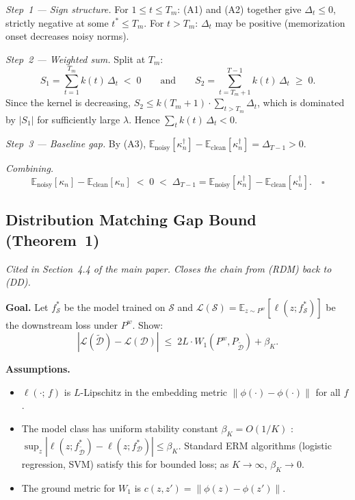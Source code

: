 \textit{Step~1 --- Sign structure.}
For $1 \leq t \leq T_m$: (A1) and (A2) together give $\Delta_t \leq 0$, strictly negative at some $t^* \leq T_m$.
For $t > T_m$: $\Delta_t$ may be positive (memorization onset decreases noisy norms).

\textit{Step~2 --- Weighted sum.}
Split at $T_m$:
\begin{equation}
    S_1 = \sum_{t=1}^{T_m} k(t)\,\Delta_t \;<\; 0
    \qquad \text{and} \qquad
    S_2 = \sum_{t=T_m+1}^{T-1} k(t)\,\Delta_t \;\geq\; 0.
\end{equation}
Since the kernel is decreasing, $S_2 \leq k(T_m+1) \cdot \sum_{t > T_m} \Delta_t$, which is dominated by $|S_1|$ for sufficiently large $\lambda$.
Hence $\sum_t k(t)\,\Delta_t < 0$.

\textit{Step~3 --- Baseline gap.}
By (A3), $\mathbb{E}_\text{noisy}[\kappa^\dagger_n] - \mathbb{E}_\text{clean}[\kappa^\dagger_n] = \Delta_{T-1} > 0$.

\textit{Combining.}
\begin{equation}
    \mathbb{E}_\text{noisy}[\kappa_n] - \mathbb{E}_\text{clean}[\kappa_n]
    \;<\; 0
    \;<\; \Delta_{T-1}
    = \mathbb{E}_\text{noisy}[\kappa^\dagger_n] - \mathbb{E}_\text{clean}[\kappa^\dagger_n].
    \quad \square
\end{equation}

\subsection{Distribution Matching Gap Bound (Theorem~1)}
\label{app:proof-gap}

\textit{Cited in Section~4.4 of the main paper. Closes the chain from (RDM) back to (DD).}

\textbf{Goal.}
Let $f^*_\mathcal{S}$ be the model trained on $\mathcal{S}$ and $\mathcal{L}(\mathcal{S}) = \mathbb{E}_{z \sim P^w}[\ell(z; f^*_\mathcal{S})]$ be the downstream loss under $P^w$. Show:
\begin{equation}
    |\mathcal{L}(\tilde{\mathcal{D}}) - \mathcal{L}(\mathcal{D})|
    \;\leq\; 2L \cdot W_1(P^w, P_{\tilde{\mathcal{D}}}) + \beta_K.
\end{equation}

\textbf{Assumptions.}
\begin{itemize}
    \item[\textbf{(B1)}] $\ell(\cdot;\,f)$ is $L$-Lipschitz in the embedding metric $\|\phi(\cdot) - \phi(\cdot)\|$ for all $f$.
    \item[\textbf{(B2)}] The model class has uniform stability constant $\beta_K = O(1/K)$ \cite{bousquet2002stability}: $\sup_z |\ell(z; f^*_{\tilde{\mathcal{D}}}) - \ell(z; f^*_\mathcal{D})| \leq \beta_K$. Standard ERM algorithms (logistic regression, SVM) satisfy this for bounded loss; as $K \to \infty$, $\beta_K \to 0$.
    \item[\textbf{(B3)}] The ground metric for $W_1$ is $c(z,z') = \|\phi(z) - \phi(z')\|$.
\end{itemize}

